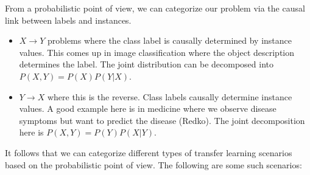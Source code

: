 From a probabilistic point of view, we can categorize our problem via the causal link between labels and instances.

\begin{itemize}
	\item $X\to Y$ problems where the class label is causally determined by instance values. This comes up in image classification where the object description determines the label. The joint distribution can be decomposed into $P(X,Y)=P(X)P(Y|X)$.
	\item $Y\to X$ where this is the reverse. Class labels causally determine instance values. A good example here is in medicine where we observe disease symptoms but want to predict the disease (Redko). The joint decomposition here is $P(X,Y)=P(Y)P(X|Y)$.
\end{itemize}

It follows that we can categorize different types of transfer learning scenarios based on the probabilistic point of view. The following are some such scenarios:

